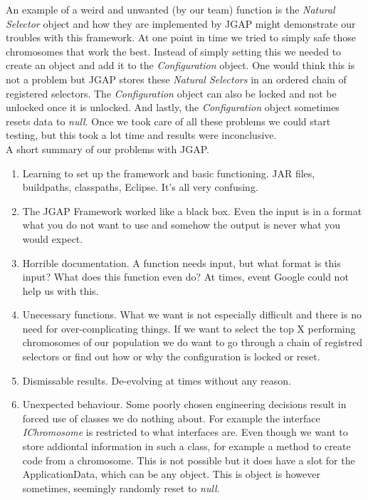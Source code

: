 \documentclass[a4paper,10pt]{article}
\begin{document}
An example of a weird and unwanted (by our team) function 
is the \textit{Natural Selector} object and how they are implemented by JGAP might demonstrate our troubles with this framework. At one point in time we tried to simply safe
 those chromosomes that work the best. Instead of simply setting this
we needed to create an object and add it to the \textit{Configuration} object. One would think this is not a problem but JGAP stores these \textit{Natural Selectors} 
in an ordered
chain of registered selectors. The \textit{Configuration} object can also be locked and not be unlocked once it is unlocked. And lastly, the \textit{Configuration} object
sometimes resets data to \textit{null}. Once we took care of all these problems we could start testing, but this took a lot time and results were inconclusive.\\

A short summary of our problems with JGAP.

\begin{enumerate}
    \item Learning to set up the framework and basic functioning. JAR files, buildpaths, classpaths, Eclipse. It's all very confusing.
    \item The JGAP Framework worked like a black box. Even the input is in a format what you do not want to use and somehow the output is never what you would expect. 
    \item Horrible documentation. A function needs input, but what format is this input? What does this function even do? At times, event Google could not help us 
    with this.
    \item Unecessary functions. What we want is not especially difficult and there is no need for over-complicating things. If we want to select the top X performing
    chromosomes of our population we do want to go through a chain of registred selectors or find out how or why the configuration is locked or reset. 
    \item Dismissable results. De-evolving at times without any reason.
    \item Unexpected behaviour. Some poorly chosen engineering decisions result in forced use of classes we do nothing about. For example the interface 
    \textit{IChromosome} is restricted to what interfaces are. Even though we want to store addiontal information in such a class, for example a method to create code
    from a chromosome. This is not possible but it does have a slot for the ApplicationData, which can be any object. This is object is however sometimes, seemingly
    randomly reset to \textit{null}.  
\end{enumerate}
\end{document}
